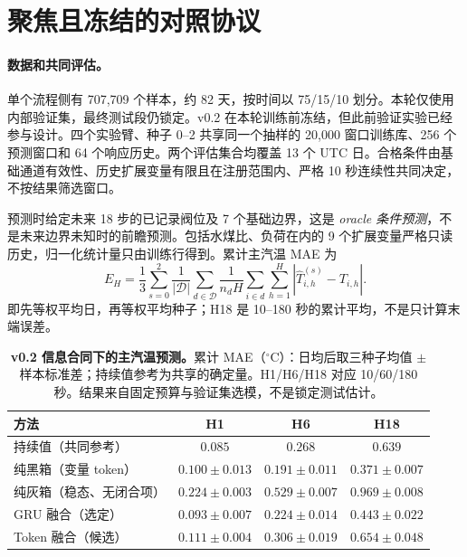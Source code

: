 \documentclass{article}
\newcommand{\degc}{\ensuremath{^{\circ}\mathrm{C}}}
\begin{document}
\clearpage
\section{聚焦且冻结的对照协议}\label{sec:protocol}

\paragraph{数据和共同评估。}
单个流程侧有 707,709 个样本，约 82 天，按时间以 75/15/10 划分。本轮仅使用内部验证集，最终测试段仍锁定。v0.2 在本轮训练前冻结，但此前验证实验已经参与设计。四个实验臂、种子 0--2 共享同一个抽样的 20,000 窗口训练库、256 个预测窗口和 64 个响应历史。两个评估集合均覆盖 13 个 UTC 日。合格条件由基础通道有效性、历史扩展变量有限且在注册范围内、严格 10 秒连续性共同决定，不按结果筛选窗口。

预测时给定未来 18 步的已记录阀位及 7 个基础边界，这是 \emph{oracle 条件预测}，不是未来边界未知时的前瞻预测。包括水煤比、负荷在内的 9 个扩展变量严格只读历史，归一化统计量只由训练行得到。累计主汽温 MAE 为
\begin{equation}
E_H=\frac{1}{3}\sum_{s=0}^2\frac{1}{|\mathcal D|}\sum_{d\in\mathcal D}
\frac{1}{n_d H}\sum_{i\in d}\sum_{h=1}^{H}|\hat T^{(s)}_{i,h}-T_{i,h}|.
\label{eq:metric}
\end{equation}
即先等权平均日，再等权平均种子；H18 是 10--180 秒的累计平均，不是只计算末端误差。

\begin{table}[!ht]
\centering\small
\begin{tabular}{lccc}
\toprule
方法 & H1 & H6 & H18\\
\midrule
持续值（共同参考） & $0.085$ & $0.268$ & $0.639$\\
纯黑箱（变量 token） & $0.100\pm0.013$ & $0.191\pm0.011$ & $0.371\pm0.007$\\
纯灰箱（稳态、无闭合项） & $0.224\pm0.003$ & $0.529\pm0.007$ & $0.969\pm0.008$\\
GRU 融合（选定） & $0.093\pm0.007$ & $0.224\pm0.014$ & $0.443\pm0.022$\\
Token 融合（候选） & $0.111\pm0.004$ & $0.306\pm0.019$ & $0.654\pm0.048$\\
\bottomrule
\end{tabular}
\caption{\textbf{v0.2 信息合同下的主汽温预测。}累计 MAE（\degc{}）：日均后取三种子均值 $\pm$ 样本标准差；持续值参考为共享的确定量。H1/H6/H18 对应 10/60/180 秒。结果来自固定预算与验证集选模，不是锁定测试估计。}
\label{tab:prediction}
\end{table}
\end{document}
